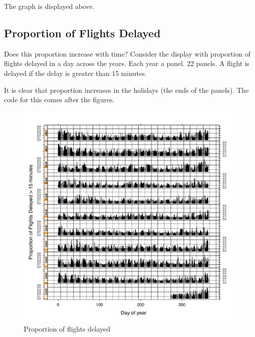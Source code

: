 \documentclass[letterpaper,10pt,english]{sphinxmanual}
\begin{document}
The graph is displayed above.


\subsection{Proportion of Flights Delayed}
\label{airline:proportion-of-flights-delayed}
Does this proportion increase with time? Consider the display with proportion of
flights delayed in a day across the years. Each year a panel. 22 panels. A
flight is delayed if the delay is greater than 15 minutes.

It is clear that proportion increases in the holidays (the ends of the
panels). The code for this comes after the figures.
\begin{figure}[htbp]
\centering

\includegraphics{propdelayed_1.pdf}
\caption{Proportion of flights delayed}\end{figure}
\end{document}
